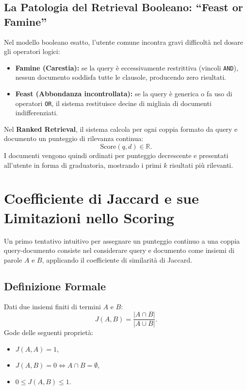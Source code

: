 \subsection{La Patologia del Retrieval Booleano: ``Feast or Famine''}
Nel modello booleano esatto, l'utente comune incontra gravi difficolt\`a nel dosare gli operatori logici:
\begin{itemize}
    \item \textbf{Famine (Carestia):} se la query \`e eccessivamente restrittiva (vincoli \texttt{AND}), nessun documento soddisfa tutte le clausole, producendo zero risultati.
    \item \textbf{Feast (Abbondanza incontrollata):} se la query \`e generica o fa uso di operatori \texttt{OR}, il sistema restituisce decine di migliaia di documenti indifferenziati.
\end{itemize}

Nel \textbf{Ranked Retrieval}, il sistema calcola per ogni coppia formato da query e documento un punteggio di rilevanza continua:
\begin{equation}
\text{Score}(q, d) \in \mathbb{R}.
\end{equation}
I documenti vengono quindi ordinati per punteggio decrescente e presentati all'utente in forma di graduatoria, mostrando i primi $k$ risultati pi\`u rilevanti.

\FloatBarrier
\section{Coefficiente di Jaccard e sue Limitazioni nello Scoring}
\label{sec:jaccard-scoring}

Un primo tentativo intuitivo per assegnare un punteggio continuo a una coppia query-documento consiste nel considerare query e documento come insiemi di parole $A$ e $B$, applicando il coefficiente di similarit\`a di Jaccard.

\subsection{Definizione Formale}
\begin{definition}
Dati due insiemi finiti di termini $A$ e $B$:
\begin{equation}
J(A, B) = \frac{|A \cap B|}{|A \cup B|}.
\end{equation}
Gode delle seguenti propriet\`a:
\begin{itemize}
    \item $J(A, A) = 1$,
    \item $J(A, B) = 0 \iff A \cap B = \emptyset$,
    \item $0 \le J(A, B) \le 1$.
\end{itemize}
\end{definition}

